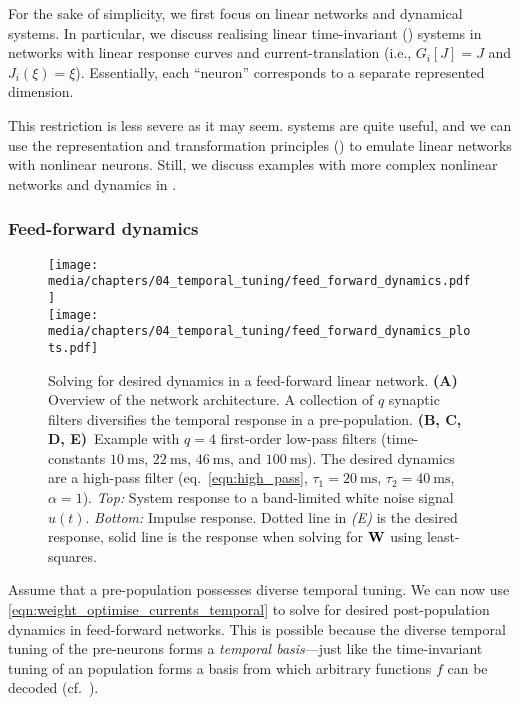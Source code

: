 For the sake of simplicity, we first focus on linear networks and dynamical systems.
In particular, we discuss realising linear time-invariant (\LTI) systems in networks with linear response curves and current-translation (i.e., $G_i[J] = J$ and $J_i(\xi) = \xi$).
Essentially, each \enquote{neuron} corresponds to a separate represented dimension.

This restriction is less severe as it may seem.
\LTI systems are quite useful, and we can use the \NEF representation and transformation principles () to emulate linear networks with nonlinear neurons.
Still, we discuss examples with more complex nonlinear networks and dynamics in .

\subsubsection{Feed-forward dynamics}

\begin{figure}
	\centering
	\texttt{[image: media/chapters/04\_temporal\_tuning/feed\_forward\_dynamics.pdf]}\\[-0.875em]
	\texttt{[image: media/chapters/04\_temporal\_tuning/feed\_forward\_dynamics\_plots.pdf]}
	\caption[Solving for desired dynamics in a feed-forward linear network]{Solving for desired dynamics in a feed-forward linear network.
	\textbf{(A)} Overview of the network architecture. 
	A collection of $q$ synaptic filters diversifies the temporal response in a pre-population.
	\textbf{(B, C, D, E)}~Example with $q = 4$ first-order low-pass filters (time-constants $\SI{10}{\milli\second}$, $\SI{22}{\milli\second}$, $\SI{46}{\milli\second}$, and $\SI{100}{\milli\second}$).
	The desired dynamics are a high-pass filter (eq.~\ref{eqn:high_pass}, $\tau_1 = \SI{20}{\milli\second}$, $\tau_2 = \SI{40}{\milli\second}$, $\alpha = 1$).
	\emph{Top:} System response to a band-limited white noise signal $u(t)$.
	\emph{Bottom:} Impulse response.
	Dotted line in \emph{(E)} is the desired response, solid line is the response when solving for $\mathbf{W}$ using least-squares.
	}
	\label{fig:feed_forward_dynamics}
\end{figure}

Assume that a pre-population possesses diverse temporal tuning.
We can now use \cref{eqn:weight_optimise_currents_temporal} to solve for desired post-population dynamics in feed-forward networks.
This is possible because the diverse temporal tuning of the pre-neurons forms a \emph{temporal basis}---just like the time-invariant tuning of an \NEF population forms a basis from which arbitrary functions $f$ can be decoded (cf.~).

